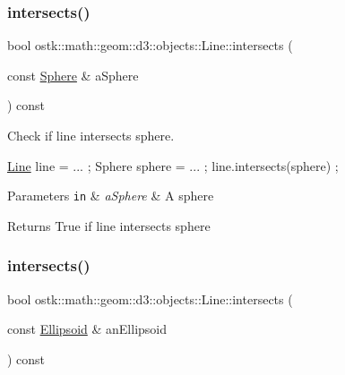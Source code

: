 \subsubsection{\texorpdfstring{intersects()}{intersects()}\hspace{0.1cm}{\footnotesize\ttfamily [3/4]}}
{\footnotesize\ttfamily bool ostk\+::math\+::geom\+::d3\+::objects\+::\+Line\+::intersects (\begin{DoxyParamCaption}\item[{const \hyperlink{classostk_1_1math_1_1geom_1_1d3_1_1objects_1_1_sphere}{Sphere} \&}]{a\+Sphere }\end{DoxyParamCaption}) const}



Check if line intersects sphere. 


\begin{DoxyCode}
\hyperlink{classostk_1_1math_1_1geom_1_1d3_1_1objects_1_1_line_a9ebdaaf67a4bd91780808f8683463ebe}{Line} line = ... ;
Sphere sphere = ... ;
line.intersects(sphere) ;
\end{DoxyCode}



\begin{DoxyParams}[1]{Parameters}
\mbox{\tt in}  & {\em a\+Sphere} & A sphere \\
\hline
\end{DoxyParams}
\begin{DoxyReturn}{Returns}
True if line intersects sphere 
\end{DoxyReturn}
\mbox{\label{classostk_1_1math_1_1geom_1_1d3_1_1objects_1_1_line_a72843cbf3252ed608969e7c4d9a1592f}} 
\subsubsection{\texorpdfstring{intersects()}{intersects()}\hspace{0.1cm}{\footnotesize\ttfamily [4/4]}}
{\footnotesize\ttfamily bool ostk\+::math\+::geom\+::d3\+::objects\+::\+Line\+::intersects (\begin{DoxyParamCaption}\item[{const \hyperlink{classostk_1_1math_1_1geom_1_1d3_1_1objects_1_1_ellipsoid}{Ellipsoid} \&}]{an\+Ellipsoid }\end{DoxyParamCaption}) const}



